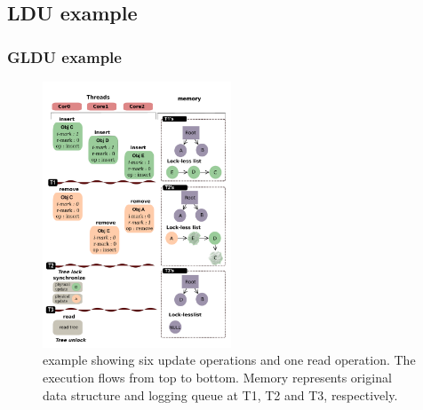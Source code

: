 

\subsection{LDU example}

\subsubsection{GLDU example}
%

\begin{figure}[tb]
  \begin{center}
     \includegraphics[width=0.5\textwidth,height=0.5\textheight,keepaspectratio]{fig/basic}
  \end{center}
  \caption{ example showing six update operations and one read
  operation. The execution flows from top to bottom. Memory represents original
  data structure and logging queue at T1, T2 and T3, respectively.}
  \label{fig:basic}
\end{figure}


